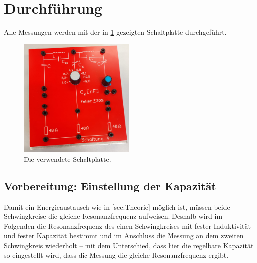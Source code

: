\section{Durchführung}
\label{sec:Durchführung}
Alle Messungen werden mit der in \ref{fig:platte}
gezeigten Schaltplatte durchgeführt. 
\begin{figure}
    \centering
    \includegraphics[width=0.5\textwidth]{plots/Platte.jpeg}
    \caption{Die verwendete Schaltplatte.}
    \label{fig:platte}
\end{figure}
\FloatBarrier

\subsection{Vorbereitung: Einstellung der Kapazität}
Damit ein Energieaustausch wie in \ref{sec:Theorie} möglich ist, müssen beide Schwingkreise die gleiche Resonanzfrequenz 
aufweisen. 
Deshalb wird im Folgenden die Resonanzfrequenz des einen Schwingkreises mit fester Induktivität und fester Kapazität bestimmt 
und im Anschluss die Messung an dem zweiten Schwingkreis wiederholt -- mit dem Unterschied, dass hier die regelbare Kapazität so
eingestellt wird, dass die Messung die gleiche Resonanzfrequenz ergibt. 

